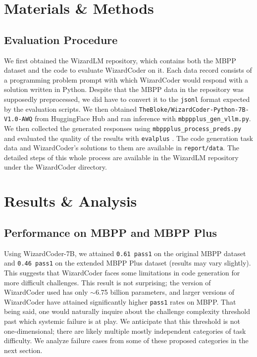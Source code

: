 \documentclass[10pt]{article}
\newcommand{\code}[1]{\texttt{#1}}
\theoremstyle{definition}
\begin{document}
\section{Materials \& Methods}

\subsection{Evaluation Procedure}
\noindent We first obtained the WizardLM repository, which contains both the MBPP dataset and the code to evaluate WizardCoder on it. Each data record consists of a programming problem prompt with which WizardCoder would respond with a solution written in Python. Despite that the MBPP data in the repository was supposedly preprocessed, we did have to convert it to the \code{jsonl} format expected by the evaluation scripts. We then obtained \code{TheBloke/WizardCoder-Python-7B-V1.0-AWQ} from HuggingFace Hub and ran inference with \code{mbppplus\_gen\_vllm.py}. We then collected the generated responses using \code{mbppplus\_process\_preds.py} and evaluated the quality of the results with \code{evalplus} \cite{evalplus}. The code generation task data and WizardCoder's solutions to them are available in \code{report/data}. The detailed steps of this whole process are available in the WizardLM repository under the WizardCoder directory.

\section{Results \& Analysis}
\subsection{Performance on MBPP and MBPP Plus}
\noindent Using WizardCoder-7B, we attained \code{0.61 pass1} on the original MBPP dataset and \code{0.46 pass1} on the extended MBPP Plus dataset (results may vary slightly). This suggests that WizardCoder faces some limitations in code generation for more difficult challenges. This result is not surprising; the version of WizardCoder used has only $\sim$6.75 billion parameters, and larger versions of WizardCoder have attained significantly higher \code{pass1} rates on MBPP. That being said, one would naturally inquire about the challenge complexity threshold past which systemic failure is at play. We anticipate that this threshold is not one-dimensional; there are likely multiple mostly independent categories of task difficulty. We analyze failure cases from some of these proposed categories in the next section.
\end{document}
